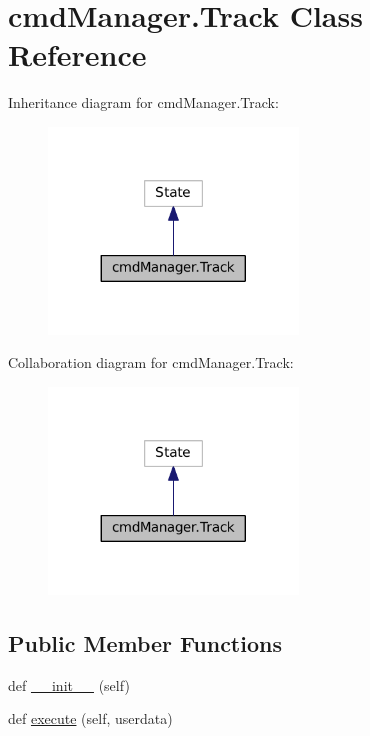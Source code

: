 \hypertarget{classcmdManager_1_1Track}{}\section{cmd\+Manager.\+Track Class Reference}
\label{classcmdManager_1_1Track}


Inheritance diagram for cmd\+Manager.\+Track\+:\nopagebreak
\begin{figure}[H]
\begin{center}
\leavevmode
\includegraphics[width=188pt]{classcmdManager_1_1Track__inherit__graph}
\end{center}
\end{figure}


Collaboration diagram for cmd\+Manager.\+Track\+:\nopagebreak
\begin{figure}[H]
\begin{center}
\leavevmode
\includegraphics[width=188pt]{classcmdManager_1_1Track__coll__graph}
\end{center}
\end{figure}
\subsection*{Public Member Functions}
\begin{DoxyCompactItemize}
\item 
def \hyperlink{classcmdManager_1_1Track_a796dff8932a4e8e62b32f04b4f8481b6}{\+\_\+\+\_\+init\+\_\+\+\_\+} (self)
\item 
def \hyperlink{classcmdManager_1_1Track_ac3ae09cfd05e6d1f870422e0a8052acd}{execute} (self, userdata)
\end{DoxyCompactItemize}


